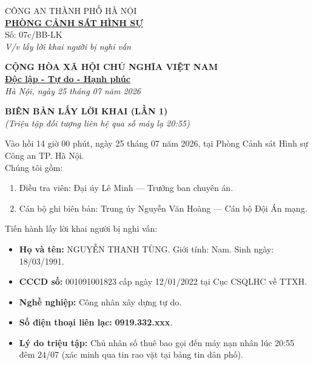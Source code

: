 \documentclass[12pt,a4paper]{article}
\begin{document}
\noindent
\begin{minipage}[t]{0.45\textwidth}
    \begin{center}
        \small
        CÔNG AN THÀNH PHỐ HÀ NỘI\\
        \textbf{\underline{PHÒNG CẢNH SÁT HÌNH SỰ}}\\[0.1cm]
        Số: 07c/BB-LK\\
        \textit{V/v lấy lời khai người bị nghi vấn}
    \end{center}
\end{minipage}
\hfill
\begin{minipage}[t]{0.52\textwidth}
    \begin{center}
        \small
        \textbf{CỘNG HÒA XÃ HỘI CHỦ NGHĨA VIỆT NAM}\\
        \textbf{\underline{Độc lập - Tự do - Hạnh phúc}}\\[0.1cm]
        \textit{Hà Nội, ngày 25 tháng 07 năm 2026}
    \end{center}
\end{minipage}

\vspace{0.6cm}

\begin{center}
    \textbf{\large BIÊN BẢN LẤY LỜI KHAI (LẦN 1)}\\
    \textit{(Triệu tập đối tượng liên hệ qua số máy lạ 20:55)}
\end{center}

\vspace{0.3cm}

\noindent Vào hồi 14 giờ 00 phút, ngày 25 tháng 07 năm 2026, tại Phòng Cảnh sát Hình sự Công an TP. Hà Nội.\\
Chúng tôi gồm:
\begin{enumerate}[label=\arabic*., leftmargin=1.5cm]
    \item Điều tra viên: Đại úy Lê Minh — Trưởng ban chuyên án.
    \item Cán bộ ghi biên bản: Trung úy Nguyễn Văn Hoàng — Cán bộ Đội Án mạng.
\end{enumerate}

\noindent Tiến hành lấy lời khai người bị nghi vấn:
\begin{itemize}[leftmargin=1.5cm]
    \item \textbf{Họ và tên:} NGUYỄN THANH TÙNG. Giới tính: Nam. Sinh ngày: 18/03/1991.
    \item \textbf{CCCD số:} 001091001823 cấp ngày 12/01/2022 tại Cục CSQLHC về TTXH.
    \item \textbf{Nghề nghiệp:} Công nhân xây dựng tự do.
    \item \textbf{Số điện thoại liên lạc:} \textbf{0919.332.xxx}.
    \item \textbf{Lý do triệu tập:} Chủ nhân số thuê bao gọi đến máy nạn nhân lúc 20:55 đêm 24/07 (xác minh qua tin rao vặt tại bảng tin dân phố).
\end{itemize}
\end{document}
